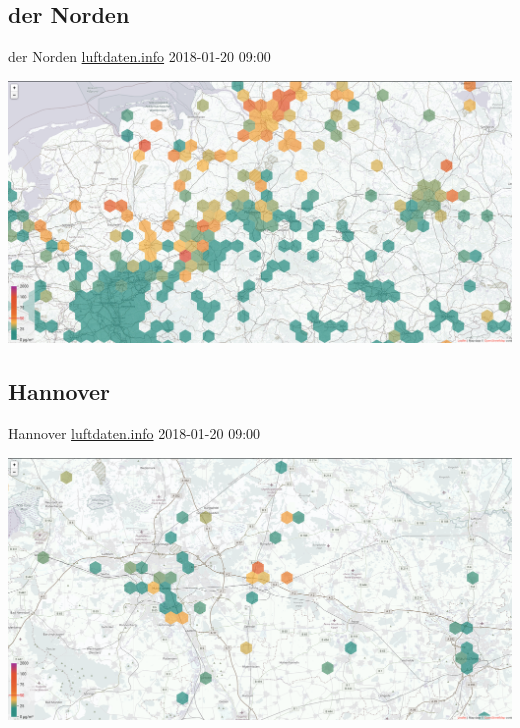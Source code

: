 \documentclass[aspectratio=169]{beamer} %
\begin{document}
\subsection{der Norden}
\begin{frame}{der Norden \href{http://hannover.maps.luftdaten.info/\#8/52.373/10.005}{luftdaten.info} 2018-01-20 09:00}
  \begin{center}
    \includegraphics[width=\textwidth]{../screenshots/luftdaten-zoom-d.png}
  \end{center}
\end{frame}
\subsection{Hannover}
\begin{frame}{Hannover \href{http://hannover.maps.luftdaten.info/\#10/52.373/10.005}{luftdaten.info} 2018-01-20 09:00}
  \begin{center}
    \includegraphics[width=\textwidth]{../screenshots/luftdaten-zoom-b.png}
  \end{center}
\end{frame}
\end{document}
